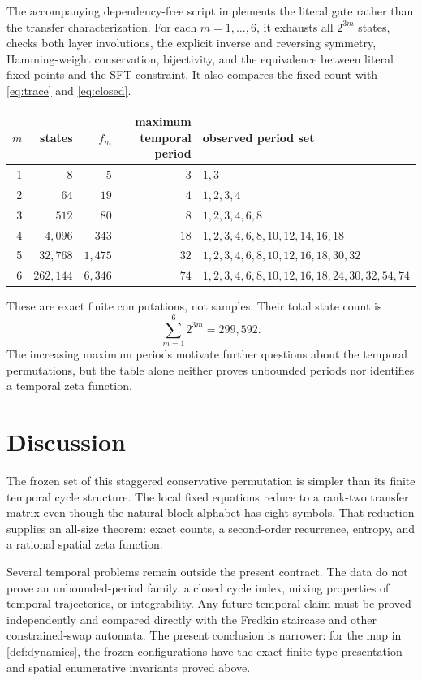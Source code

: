 \documentclass[11pt,a4paper]{amsart}
\theoremstyle{definition}
\theoremstyle{remark}
\begin{document}
The accompanying dependency-free script implements the literal gate rather
than the transfer characterization.  For each $m=1,\ldots,6$, it exhausts
all $2^{3m}$ states, checks both layer involutions, the explicit inverse and
reversing symmetry, Hamming-weight conservation, bijectivity, and the
equivalence between literal fixed points and the SFT constraint.  It also
compares the fixed count with \eqref{eq:trace} and \eqref{eq:closed}.

\begin{center}
\small
\begin{tabular}{rrrrl}
\toprule
$m$ & states & $f_m$ & maximum temporal period & observed period set \\
\midrule
1 & $8$       & $5$    & $3$  & $1,3$ \\
2 & $64$      & $19$   & $4$  & $1,2,3,4$ \\
3 & $512$     & $80$   & $8$  & $1,2,3,4,6,8$ \\
4 & $4{,}096$ & $343$  & $18$ & $1,2,3,4,6,8,10,12,14,16,18$ \\
5 & $32{,}768$ & $1{,}475$ & $32$ & $1,2,3,4,6,8,10,12,16,18,30,32$ \\
6 & $262{,}144$ & $6{,}346$ & $74$ & $1,2,3,4,6,8,10,12,16,18,24,30,32,54,74$ \\
\bottomrule
\end{tabular}
\end{center}

These are exact finite computations, not samples.  Their total state count is
\[
 \sum_{m=1}^{6}2^{3m}=299{,}592.
\]
The increasing maximum periods motivate further questions about the temporal
permutations, but the table alone neither proves unbounded periods nor
identifies a temporal zeta function.

\section{Discussion}

The frozen set of this staggered conservative permutation is simpler than
its finite temporal cycle structure.  The local fixed equations reduce to a
rank-two transfer matrix even though the natural block alphabet has eight
symbols.  That reduction supplies an all-size theorem: exact counts, a
second-order recurrence, entropy, and a rational spatial zeta function.

Several temporal problems remain outside the present contract.  The data do
not prove an unbounded-period family, a closed cycle index, mixing properties
of temporal trajectories, or integrability.  Any future temporal claim must
be proved independently and compared directly with the Fredkin staircase
and other constrained-swap automata.  The present conclusion is narrower:
for the map in \cref{def:dynamics}, the frozen configurations have the exact
finite-type presentation and spatial enumerative invariants proved above.
\end{document}
